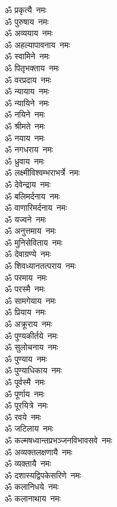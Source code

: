 \begin{multicols}{2}
\begin{flushleft}
ॐ प्रकृत्यै~नमः\\
ॐ पुरुषाय~नमः\\
ॐ अव्ययाय~नमः\\
ॐ अहल्यापावनाय~नमः\\
ॐ स्वामिने~नमः\hfill{}\\
ॐ पितृभक्ताय~नमः\\
ॐ वरप्रदाय~नमः\\
ॐ न्यायाय~नमः\\
ॐ न्यायिने~नमः\\
ॐ नयिने~नमः\\
ॐ श्रीमते~नमः\\
ॐ नयाय~नमः\\
ॐ नगधराय~नमः\\
ॐ ध्रुवाय~नमः\\
ॐ लक्ष्मीविश्वम्भराभर्त्रे~नमः\hfill{}\\
ॐ देवेन्द्राय~नमः\\
ॐ बलिमर्दनाय~नमः\\
ॐ वाणारिमर्दनाय~नमः\\
ॐ यज्वने~नमः\\
ॐ अनुत्तमाय~नमः\\
ॐ मुनिसेविताय~नमः\\
ॐ देवाग्रण्ये~नमः\\
ॐ शिवध्यानतत्पराय~नमः\\
ॐ परमाय~नमः\\
ॐ परस्मै~नमः\hfill{}\\
ॐ सामगेयाय~नमः\\
ॐ प्रियाय~नमः\\
ॐ अक्रूराय~नमः\\
ॐ पुण्यकीर्तये~नमः\\
ॐ सुलोचनाय~नमः\\
ॐ पुण्याय~नमः\\
ॐ पुण्याधिकाय~नमः\\
ॐ पूर्वस्मै~नमः\\
ॐ पूर्णाय~नमः\\
ॐ पूरयित्रे~नमः\hfill{}\\
ॐ रवये~नमः\\
ॐ जटिलाय~नमः\\
ॐ कल्मषध्वान्तप्रभञ्जन\-विभावसवे~नमः\\
ॐ अव्यक्तलक्षणायै~नमः\\
ॐ व्यक्तायै~नमः\\
ॐ दशास्यद्विपकेसरिणे~नमः\\
ॐ कलानिधये~नमः\\
ॐ कलानाथाय~नमः\\

\end{flushleft}
\end{multicols}
